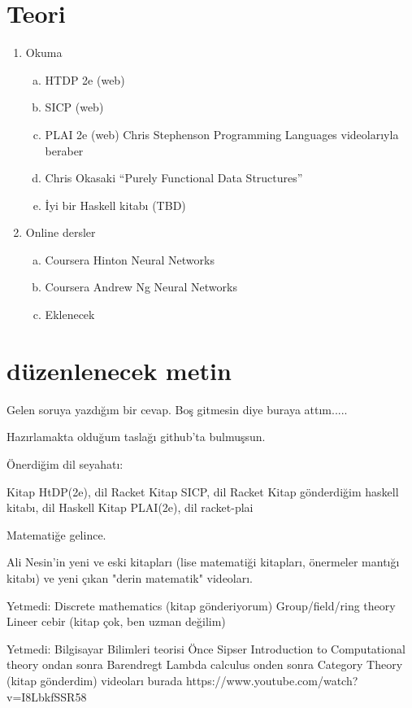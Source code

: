 \documentclass[a4paper,10pt]{article}
\begin{document}
\section*{Teori}
\begin{enumerate}
  \item Okuma
    \begin{enumerate}[(a)]
      \item HTDP 2e (web)
      \item SICP (web)
      \item PLAI 2e (web) Chris Stephenson Programming Languages videolarıyla beraber 
      \item Chris Okasaki ``Purely Functional Data Structures''
      \item İyi bir Haskell kitabı (TBD)
    \end{enumerate}
  \item Online dersler
      \begin{enumerate}[(a)]
      \item Coursera Hinton Neural Networks
      \item Coursera  Andrew Ng Neural Networks
      \item Eklenecek
    \end{enumerate}

\end{enumerate}


\section*{düzenlenecek metin}

Gelen soruya yazdığım bir cevap. Boş gitmesin diye buraya attım.....

Hazırlamakta olduğum taslağı github'ta bulmuşsun.

Önerdiğim dil seyahatı:
 

Kitap HtDP(2e), dil Racket
Kitap SICP, dil Racket
Kitap gönderdiğim haskell kitabı, dil Haskell
Kitap PLAI(2e), dil racket-plai

Matematiğe gelince.

Ali Nesin'in yeni ve eski kitapları (lise matematiği kitapları, önermeler mantığı kitabı) ve yeni çıkan "derin matematik" videoları.

Yetmedi:
Discrete mathematics (kitap gönderiyorum)
Group/field/ring theory
Lineer cebir (kitap çok, ben uzman değilim)

Yetmedi:
Bilgisayar Bilimleri teorisi
Önce Sipser Introduction to Computational theory
ondan sonra Barendregt Lambda calculus
onden sonra Category Theory (kitap gönderdim) videoları burada
https://www.youtube.com/watch?v=I8LbkfSSR58
\end{document}
